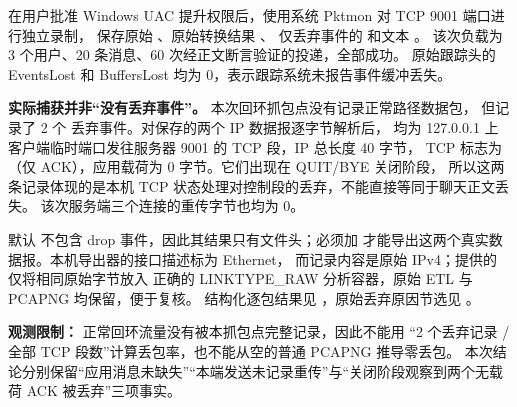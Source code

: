 
在用户批准 Windows UAC 提升权限后，使用系统 Pktmon 对 TCP 9001 端口进行独立录制，
保存原始 、原始转换结果 、
仅丢弃事件的  和文本 。
该次负载为 3 个用户、20 条消息、60 次经正文断言验证的投递，全部成功。
原始跟踪头的 EventsLost 和 BuffersLost 均为 0，表示跟踪系统未报告事件缓冲丢失。

\textbf{实际捕获并非“没有丢弃事件”。} 本次回环抓包点没有记录正常路径数据包，
但记录了 2 个  丢弃事件。对保存的两个 IP 数据报逐字节解析后，
均为 127.0.0.1 上客户端临时端口发往服务器 9001 的 TCP 段，IP 总长度 40 字节，
TCP 标志为 （仅 ACK），应用载荷为 0 字节。它们出现在 QUIT/BYE 关闭阶段，
所以这两条记录体现的是本机 TCP 状态处理对控制段的丢弃，不能直接等同于聊天正文丢失。
该次服务端三个连接的重传字节也均为 0。

默认  不包含 drop 事件，因此其结果只有文件头；必须加
 才能导出这两个真实数据报。本机导出器的接口描述标为 Ethernet，
而记录内容是原始 IPv4；提供的  仅将相同原始字节放入
正确的 LINKTYPE\_RAW 分析容器，原始 ETL 与 PCAPNG 均保留，便于复核。
结构化逐包结果见 ，原始丢弃原因节选见 。

\textbf{观测限制：} 正常回环流量没有被本抓包点完整记录，因此不能用
“2 个丢弃记录 / 全部 TCP 段数”计算丢包率，也不能从空的普通 PCAPNG 推导零丢包。
本次结论分别保留“应用消息未缺失”“本端发送未记录重传”与“关闭阶段观察到两个无载荷 ACK 被丢弃”三项事实。
